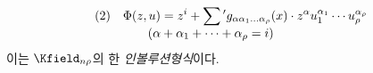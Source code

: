 
\[
\begin{array}{@{}l@{\quad}l@{}}
(2)& \displaystyle \Phi(z,u)=z^i+\sum{}'g_{\alpha\alpha_1\ldots\alpha_\rho}(x)\cdot
z^\alpha u_1^{\alpha_1}\cdots u_\rho^{\alpha_\rho}\\
& \displaystyle\qquad(\alpha+\alpha_1+\cdots+\alpha_\rho=i)
\end{array}
\]
이는 $\Kfield_{n\rho}$의 한 \emph{인볼루션형식}이다.
